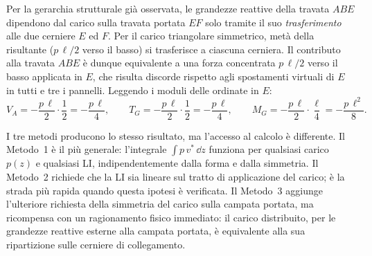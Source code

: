 \begin{esempio}
\begin{svolgimento}
		
		Per la gerarchia strutturale già osservata, le grandezze
		reattive della travata $ABE$ dipendono dal carico sulla
		travata portata $EF$ solo tramite il suo
		\emph{trasferimento} alle due cerniere $E$ ed $F$. Per il
		carico triangolare simmetrico, metà della risultante
		($p\,\ell/2$ verso il basso) si trasferisce a ciascuna
		cerniera. Il contributo alla travata $ABE$ è dunque
		equivalente a una forza concentrata $p\,\ell/2$ verso il
		basso applicata in $E$, che risulta discorde rispetto
		agli spostamenti virtuali di $E$ in tutti e tre i
		pannelli. Leggendo i moduli delle ordinate in $E$:
		\begin{equation*}
			V_A = -\frac{p\,\ell}{2} \cdot \frac{1}{2}
			= -\frac{p\,\ell}{4},
			\qquad
			T_G = -\frac{p\,\ell}{2} \cdot \frac{1}{2}
			= -\frac{p\,\ell}{4},
			\qquad
			M_G = -\frac{p\,\ell}{2} \cdot \frac{\ell}{4}
			= -\frac{p\,\ell^2}{8}.
		\end{equation*}
		
	\end{svolgimento}
	
	\begin{oss}
		I tre metodi producono lo stesso risultato, ma
		l'accesso al calcolo è differente. Il Metodo~1 è il
		più generale: l'integrale $\int p\,v^*\,\dd z$
		funziona per qualsiasi carico $p(z)$ e qualsiasi LI,
		indipendentemente dalla forma e dalla simmetria. Il
		Metodo~2 richiede che la LI sia lineare sul tratto
		di applicazione del carico; è la strada più rapida
		quando questa ipotesi è verificata. Il Metodo~3
		aggiunge l'ulteriore richiesta della simmetria del
		carico sulla campata portata, ma ricompensa con un
		ragionamento fisico immediato: il carico
		distribuito, per le grandezze reattive esterne alla
		campata portata, è equivalente alla sua
		ripartizione sulle cerniere di collegamento.
	\end{oss}
	
\end{esempio}


